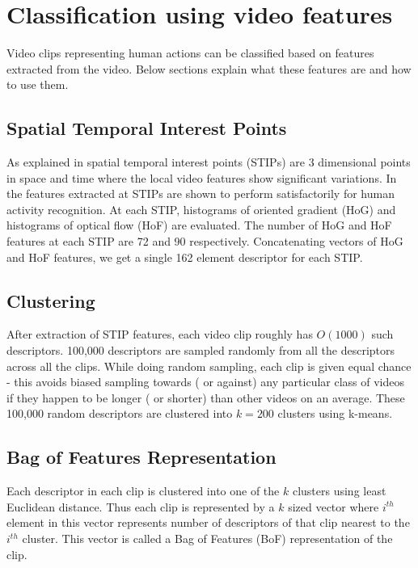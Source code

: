 \chapter{Classification using video features}

\label{ch2_STIP}


Video clips representing human actions can be classified based on features extracted from the video.
Below sections explain what these features are and how to use them.

\section{Spatial Temporal Interest Points}
As explained in \cite{laptev2005} spatial temporal interest points (STIPs) are 3 dimensional points in 
space and time where the local video features show significant variations. 
In \cite{actionsInContext} the features extracted at STIPs are shown to perform satisfactorily for human activity recognition. 
At each STIP, histograms of oriented gradient (HoG) and  histograms of optical flow (HoF) are evaluated.
The number of HoG and HoF features at each STIP are 72 and 90 respectively.
Concatenating vectors of HoG and HoF features, we get a single 162 element descriptor for each STIP. 

\section{Clustering}
After extraction of STIP features, each video clip roughly has $O(1000)$ such descriptors.
100,000 descriptors are sampled randomly from all the descriptors across all the clips.
While doing random sampling, each clip is given equal chance - this avoids biased sampling
towards ( or against) any particular class of videos if they happen to be longer ( or shorter) than other videos on an average.
These 100,000 random descriptors are clustered into $k = 200$ clusters using k-means.

\section{Bag of Features Representation}
Each descriptor in each clip is clustered into one of the $k$ clusters using
least Euclidean distance. Thus each clip is represented by a $k$ sized vector
where $i^{th}$ element in this vector represents number of descriptors of that clip 
nearest to the $i^{th}$ cluster. This vector is called a Bag of Features (BoF)
representation of the clip.


